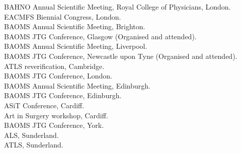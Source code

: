  BAHNO Annual Scientific Meeting, Royal College of Physicians, London. \\
 EACMFS Biennial Congress, London. \\
 BAOMS Annual Scientific Meeting, Brighton. \\
 BAOMS JTG Conference, Glasgow (Organised and attended). \\
 BAOMS Annual Scientific Meeting, Liverpool. \\
 BAOMS JTG Conference, Newcastle upon Tyne (Organised and attended). \\
 ATLS reverification, Cambridge. \\
 BAOMS JTG Conference, London. \\
 BAOMS Annual Scientific Meeting, Edinburgh. \\
 BAOMS JTG Conference, Edinburgh. \\
 ASiT Conference, Cardiff. \\
 Art in Surgery workshop, Cardiff. \\
 BAOMS JTG Conference, York. \\
 ALS, Sunderland. \\
 ATLS, Sunderland. \\



